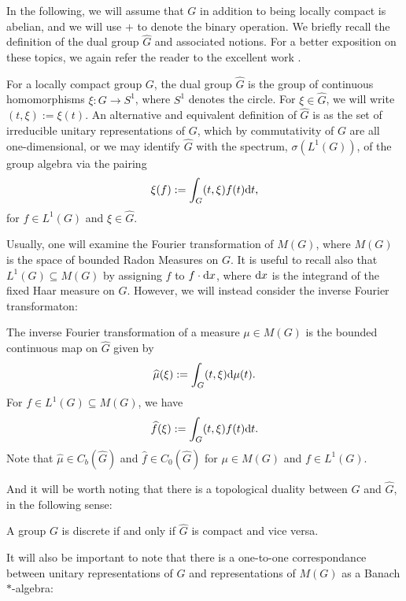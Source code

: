 In the following, we will assume that $G$ in addition to being locally compact is abelian, and we will use $+$ to denote the binary operation. We briefly recall the definition of the dual group $\hat G$ and associated notions. For a better exposition on these topics, we again refer the reader to the excellent work \cite{folland2016fourier}. 
\begin{definition}
For a locally compact group $G$, the dual group $\hat G$ is the group of continuous homomorphisms $\xi \colon G \to S^1$, where $S^1$ denotes the circle. For $\xi \in \hat G$, we will write $(t,\xi) := \xi(t)$. An alternative and equivalent definition of $\hat G$ is as the set of irreducible unitary representations of $G$, which by commutativity of $G$ are all one-dimensional, or we may identify $\hat G$ with the spectrum, $\sigma(L^1(G))$, of the group algebra via the pairing
\begin{align}
	\xi(f):=\int_G (t , \xi) f(t) \mathrm{d} t,
	\label{abel:fourier}
\end{align}
for $f \in L^1(G)$ and $\xi \in \hat G$. 
\end{definition}
Usually, one will examine the Fourier transformation of $M(G)$, where $M(G)$ is the space of bounded Radon Measures on $G$. It is useful to recall also that $L^1(G) \subseteq M(G)$ by assigning $f$ to $f \cdot \mathrm{d} x$, where $\mathrm{d} x$ is the integrand of the fixed Haar measure on $G$. However, we will instead consider the inverse Fourier transformaton:
\begin{definition}
The inverse Fourier transformation of a measure $\mu \in M(G)$ is the bounded continuous map on $\hat G$ given by 
\begin{align*}
\widehat{\mu}(\xi) := \int_G	(t, \xi) \mathrm{d} \mu(t).
\end{align*}
For $f \in L^1(G) \subseteq M(G)$, we have
\begin{align*}
	\widehat{f}(\xi) := \int_G (t, \xi) f(t) \mathrm{d} t.
\end{align*}
Note that $\hat \mu \in C_b(\hat G)$ and $\hat f \in C_0(\hat G)$ for $\mu \in M(G)$ and $f \in L^1(G)$.
\end{definition}
And it will be worth noting that there is a topological duality between $G$ and $\hat G$, in the following sense:
\begin{proposition}
A group $G$ is discrete if and only if $\hat G$ is compact and vice versa.
\end{proposition}
It will also be important to note that there is a one-to-one correspondance between unitary representations of $G$ and representations of $M(G)$ as a Banach $*$-algebra:
